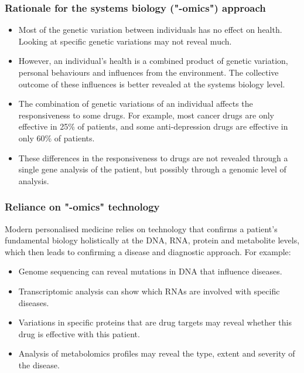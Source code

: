 \documentclass[11pt]{article}
\begin{document}
\subsubsection{Rationale for the systems biology ("-omics") approach}
\label{sec:org334b273}
\begin{itemize}
\item Most of the genetic variation between individuals has no effect on health. Looking at specific genetic variations may not reveal much.
\item However, an individual's health is a combined product of genetic variation, personal behaviours and influences from the environment. The collective outcome of these influences is better revealed at the systems biology level.
\item The combination of genetic variations of an individual affects the responsiveness to some drugs. For example, most cancer drugs are only effective in 25\% of patients, and some anti-depression drugs are effective in only 60\% of patients.
\item These differences in the responsiveness to drugs are not revealed through a single gene analysis of the patient, but possibly through a genomic level of analysis.
\end{itemize}
\subsubsection{Reliance on "-omics" technology}
\label{sec:org2f4c98e}
Modern personalised medicine relies on technology that confirms a patient's fundamental biology holistically at the DNA, RNA, protein and metabolite levels, which then leads to confirming a disease and diagnostic approach. For example:
\begin{itemize}
\item Genome sequencing can reveal mutations in DNA that influence diseases.
\item Transcriptomic analysis can show which RNAs are involved with specific diseases.
\item Variations in specific proteins that are drug targets may reveal whether this drug is effective with this patient.
\item Analysis of metabolomics profiles may reveal the type, extent and severity of the disease.
\end{itemize}

\newpage
\end{document}
